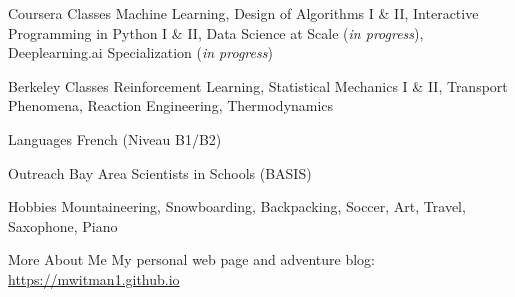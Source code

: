 

\begin{cvskillsnoncentered}

  \cvskill
    {Coursera Classes} %
    {Machine Learning, Design of Algorithms I \& II, Interactive Programming in Python I \& II, Data Science at Scale (\textit{in progress}), Deeplearning.ai Specialization (\textit{in progress})} 
    
  \cvskill
    {Berkeley Classes} %
    {Reinforcement Learning, Statistical Mechanics I \& II, Transport Phenomena, Reaction Engineering, Thermodynamics}


  \cvskill
    {Languages} %
    {French (Niveau B1/B2)} %

  \cvskill
    {Outreach} %
    {Bay Area Scientists in Schools (BASIS)} %

  \cvskill
    {Hobbies} %
    {Mountaineering, Snowboarding, Backpacking, Soccer, Art, Travel, Saxophone, Piano} %
    
      \cvskill
    {More About Me} %
    {My personal web page and adventure blog: \url{https://mwitman1.github.io}} %

\end{cvskillsnoncentered}
